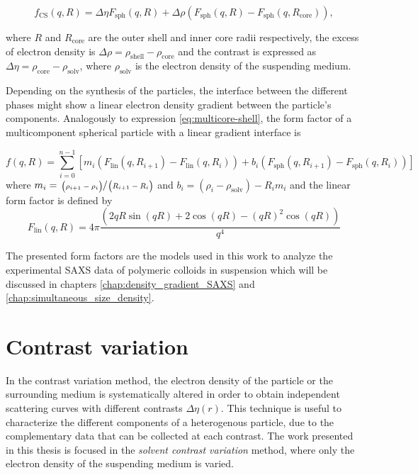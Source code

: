 \begin{equation}
        \label{eq:ff_cs}
	f_{\text{CS}}(q,R)=  \Delta\eta F_{\text{sph}}(q,R) +  \Delta\rho\left( F_{\text{sph}}(q,R)-F_{\text{sph}}(q,R_{\text{core}}) \right) ,
\end{equation}

where \(R \) and \(R_{\text{core}} \)  are the outer shell and inner core radii respectively, the excess of electron density is \(\Delta\rho=\rho_{\text{shell}}-\rho_{\text{core}}\) and the contrast is expressed as \(\Delta\eta=\rho_{\text{core}}-\rho_{\text{solv}}\), where $\rho_{\text{solv}}$ is the electron density of the suspending medium.

Depending on the synthesis of the particles, the interface between the different phases might show a linear electron density gradient between the particle's components. Analogously to expression \ref{eq:multicore-shell}, the form factor of a multicomponent spherical particle with a linear gradient interface is

\begin{equation}
f\left(q,R \right) = \sum_{i=0}^{n-1}\left[m_i \left( F_{\text{lin}}(q,R_{i+1})-F_{\text{lin}}(q,R_{i}) \right) +b_i \left( F_{\text{sph}}(q,R_{i+1})-F_{\text{sph}}(q,R_{i}) \right) \right]
\end{equation}
where $m_i=\sfrac{\left( \rho_{i+1}-\rho_{i} \right)}{\left( R_{i+1}-R_{i} \right)}$ and $b_i=\left( \rho_i-\rho_{\text{solv}} \right)-R_im_i$ and the linear form factor is defined by
\begin{equation}
F_{\text{lin}}(q,R) = 4\pi\frac{ \left( 2qR\sin(qR)+2\cos(qR)-(qR)^2\cos(qR) \right)}{q^4}
\end{equation}

The presented form factors are the models used in this work to analyze the experimental SAXS data of polymeric colloids in suspension which will be discussed in chapters \ref{chap:density_gradient_SAXS} and \ref{chap:simultaneous_size_density}.

\section{Contrast variation}
\label{sec:contrast_variation_theory}

In the contrast variation method, the electron density of the particle or the surrounding medium is systematically altered in order to obtain independent scattering curves with different contrasts $\Delta \eta (r)$. This technique is useful to characterize the different components of a heterogenous particle, due to the complementary data that can be collected at each contrast. The work presented in this thesis is focused in the \emph{solvent contrast variation} method, where only the electron density of the suspending medium is varied.

